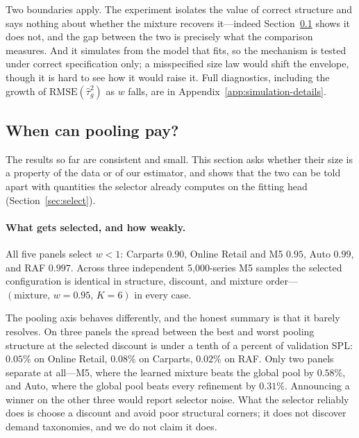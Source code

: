 Two boundaries apply. The experiment isolates the value of correct
structure and says nothing about whether the mixture recovers it---indeed
Section~\ref{sec:leverage} shows it does not, and the gap between the two
is precisely what the comparison measures. And it simulates from the model
that \EBB{} fits, so the mechanism is tested under correct specification
only; a misspecified size law would shift the envelope, though it is hard
to see how it would raise it. Full diagnostics, including the growth of
$\mathrm{RMSE}(\hat\tau_g^2)$ as $w$ falls, are in
Appendix~\ref{app:simulation-details}.

\subsection{When can pooling pay?}\label{sec:leverage}

The results so far are consistent and small. This section asks whether
their size is a property of the data or of our estimator, and shows that
the two can be told apart with quantities the selector already computes on
the fitting head (Section~\ref{sec:select}).

\paragraph{What gets selected, and how weakly.}
All five panels select $w<1$: Carparts $0.90$, Online Retail and M5
$0.95$, Auto $0.99$, and RAF $0.997$. Across three independent
5{,}000-series M5 samples the selected configuration is identical in
structure, discount, and mixture order---$(\text{mixture},\,w{=}0.95,\,
K{=}6)$ in every case.

The pooling axis behaves differently, and the honest summary is that it
barely resolves. On three panels the spread between the best and worst
pooling structure at the selected discount is under a tenth of a percent
of validation SPL: $0.05\%$ on Online Retail, $0.08\%$ on Carparts,
$0.02\%$ on RAF. Only two panels separate at all---M5, where the learned
mixture beats the global pool by $0.58\%$, and Auto, where the global pool
beats every refinement by $0.31\%$. Announcing a winner on the other three
would report selector noise. What the selector reliably does is choose a
discount and avoid poor structural corners; it does not discover demand
taxonomies, and we do not claim it does.

